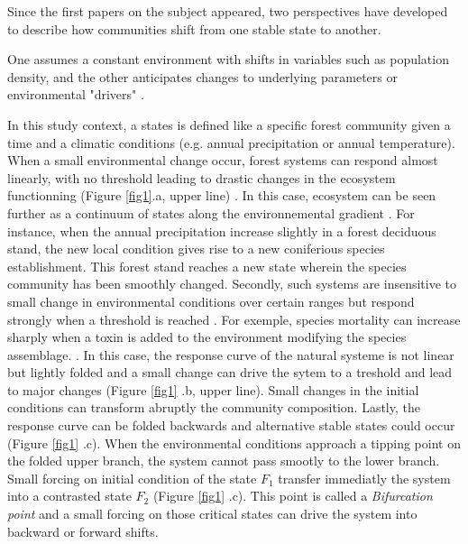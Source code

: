 Since the first papers on the
subject appeared, two perspectives have developed to describe how communities
shift from one stable state to another. 

One assumes a constant environment
with shifts in variables such as population density, and the other anticipates
changes to underlying parameters or environmental "drivers" \cite{May1977,Scheffer2001}. 


In this study context, a states is defined like a specific forest community
given a time and a climatic conditions (e.g. annual precipitation or annual
temperature). When a small environmental change occur, forest systems can
respond almost linearly, with no threshold leading to drastic changes in the
ecosystem functionning (Figure \ref{fig1}.a, upper line)
\cite{Scheffer2001,Scheffer2009}. In this case, ecosystem can be seen further
as a continuum of states along the environnemental gradient
\cite{Scheffer2001,Scheffer2009,scheffer2009critical}. For instance, when the
annual precipitation increase slightly in a forest deciduous stand, the new
local condition gives rise to a new coniferious species establishment. This
forest stand reaches a new state wherein the species community has been
smoothly changed. Secondly, such systems are insensitive to small change in
environmental conditions over certain ranges but respond strongly when a
threshold is reached \cite{scheffer2009critical}. For exemple, species
mortality can increase sharply when a toxin is added to the environment
modifying the species assemblage. \cite{scheffer2009critical}. In this case,
the response curve of the natural systeme is not linear but lightly folded and
a small change can drive the sytem to a treshold and lead to major changes
(Figure \ref{fig1} .b, upper line). Small changes in the initial conditions
can transform abruptly the community composition. Lastly, the response curve
can be folded backwards and alternative stable states could occur (Figure
\ref{fig1} .c). When the environmental conditions approach a tipping point on
the folded upper branch, the system cannot pass smootly to the lower branch.
Small forcing on initial condition of the state $F_1$ transfer immediatly the
system into a contrasted state $F_2$ (Figure \ref{fig1} .c). This point is
called a \textit{Bifurcation point} and a small forcing on those critical
states can drive the system into backward or forward shifts.



